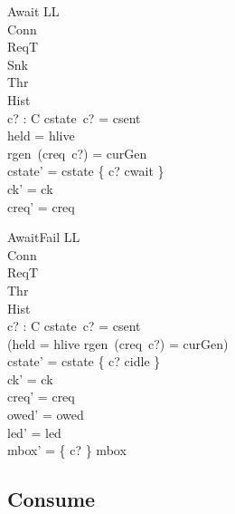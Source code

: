 \documentclass[a4paper,10pt,fleqn]{article}
\begin{document}
\begin{schema}{Await}
  \Delta LL \\
  \Xi Conn \\
  \Xi ReqT \\
  \Xi Snk \\
  \Xi Thr \\
  \Xi Hist \\
  c? : C
\where
  cstate~c? = csent \\
  held = hlive \\
  rgen~(creq~c?) = curGen \\
  cstate' = cstate \oplus \{ c? \mapsto cwait \} \\
  ck' = ck \\
  creq' = creq
\end{schema}

\begin{schema}{AwaitFail}
  \Delta LL \\
  \Xi Conn \\
  \Xi ReqT \\
  \Xi Thr \\
  \Xi Hist \\
  c? : C
\where
  cstate~c? = csent \\
  \lnot (held = hlive \land rgen~(creq~c?) = curGen) \\
  cstate' = cstate \oplus \{ c? \mapsto cidle \} \\
  ck' = ck \\
  creq' = creq \\
  owed' = owed \\
  led' = led \\
  mbox' = \{ c? \} \ndres mbox
\end{schema}

\subsection{Consume}
\end{document}

